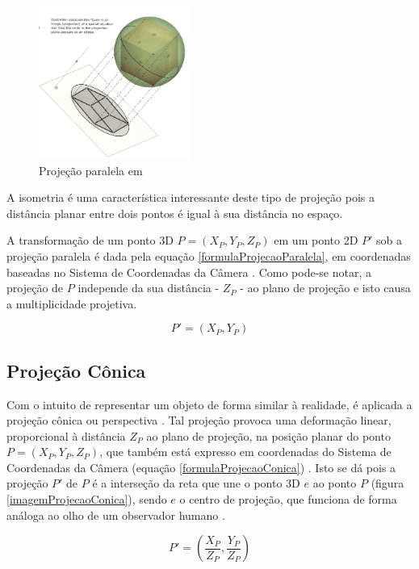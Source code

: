		\begin{figure}[!htb]
			\centering
			\includegraphics[height=5cm]{imagens/projecaoParalela.jpg}
			\caption{Projeção paralela em \cite{archiGeoBook}}
			\label{imagemProjecaoParalela}
		\end{figure}
		
			A isometria é uma característica interessante deste tipo de projeção pois a distância planar entre dois pontos é igual à sua distância no espaço.
			
			A transformação de um ponto 3D $P = (X_P, Y_P, Z_P)$ em um ponto 2D $P'$ sob a projeção paralela é dada pela equação \ref{formulaProjecaoParalela}, em coordenadas baseadas no Sistema de Coordenadas da Câmera \cite{foto3D}. Como pode-se notar, a projeção de $P$ independe da sua distância - $Z_P$ - ao plano de projeção e isto causa a multiplicidade projetiva.
			
			\begin{equation}
				\label{formulaProjecaoParalela}
				P' = (X_P, Y_P)
			\end{equation}
			
		\subsection{Projeção Cônica}
			\label{subsecaoProjecaoConica}
			Com o intuito de representar um objeto de forma similar à realidade, é aplicada a projeção cônica ou perspectiva \cite{archiGeoBook}. Tal projeção provoca uma deformação linear, proporcional à distância $Z_P$ ao plano de projeção, na posição planar do ponto $P = (X_P, Y_P, Z_P)$, que também está expresso em coordenadas do Sistema de Coordenadas da Câmera (equação \ref{formulaProjecaoConica}) \cite{foto3D}. Isto se dá pois a projeção $P'$ de $P$ é a interseção da reta que une o ponto 3D $e$ ao ponto $P$ (figura \ref{imagemProjecaoConica}), sendo $e$ o centro de projeção, que funciona de forma análoga ao olho de um observador humano \cite{archiGeoBook}.
			
			\begin{equation}
				\label{formulaProjecaoConica}
				P' = \left (\frac{X_P}{Z_P}, \frac{Y_P}{Z_P}\right )
			\end{equation}
			
